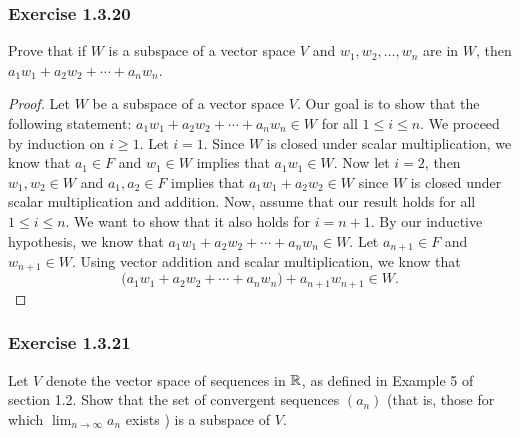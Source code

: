 \subsubsection{Exercise 1.3.20} Prove that if \( W  \) is a subspace of a vector space \( V  \) and \( w_{1} , w_{2} , \dots, w_{n}  \) are in \( W  \), then \( a_{1} w_{1} + a_{2} w_{2} + \cdots + a_{n} w_{n}  \).
\begin{proof}
Let \( W  \) be a subspace of a vector space \( V \). Our goal is to show that the following statement: \( a_{1} w_{1} + a_{2} w_{2} + \cdots + a_{n} w_{n} \in W  \) for all \( 1 \leq i  \leq n \). We proceed by induction on \( i \geq 1  \). Let \( i = 1  \). Since \( W  \) is closed under scalar multiplication, we know that \( a_{1} \in F  \) and \( w_{1} \in W  \) implies that \( a_{1} w_{1} \in W  \). Now let \( i = 2  \), then \( w_{1}, w_{2} \in W  \) and \( a_{1}, a_{2} \in F  \) implies that \( a_{1} w_{1} + a_{2} w_{2} \in W  \) since \( W  \) is closed under scalar multiplication and addition. Now, assume that our result holds for all \( 1 \leq i \leq  n  \). We want to show that it also holds for \( i = n + 1  \). By our inductive hypothesis, we know that \( a_{1} w_{1} + a_{2} w_{2} + \cdots + a_{n} w_{n} \in W  \). Let \( a_{n+1} \in F   \) and \( w_{n+1 } \in W  \). Using vector addition and scalar multiplication, we know that 
\[  \Big( a_{1} w_{1} + a_{2} w_{2} + \cdots + a_{n} w_{n} \Big)  + a_{n+1} w_{n+1} \in W. \]
\end{proof}

\subsubsection{Exercise 1.3.21} Let \( V  \) denote the vector space of sequences in  \( \mathbb{R}  \), as defined in Example 5 of section 1.2. Show that the set of convergent sequences \( (a_{n}) \) (that is, those for which \( \lim_{ n \to \infty  } a_{n}  \) exists ) is a subspace of \( V  \).

